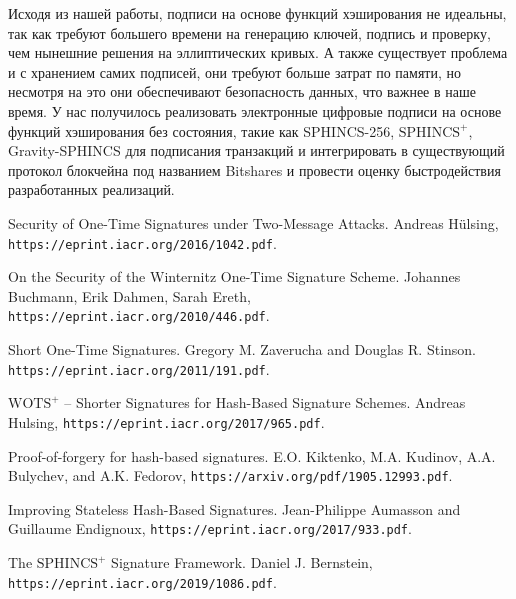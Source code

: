 \documentclass[a4paper, 14pt]{extarticle}
\begin{document}
Исходя из нашей работы, подписи на основе функций хэширования не идеальны, так как требуют большего времени на генерацию ключей, подпись и проверку, чем нынешние решения на эллиптических кривых. А также существует проблема и с хранением самих подписей, они требуют больше затрат по памяти, но несмотря на это они обеспечивают безопасность данных, что важнее в наше время. У нас получилось реализовать электронные цифровые подписи на основе функций хэширования без состояния, такие как SPHINCS-256, $\text{SPHINCS}^+$, Gravity-SPHINCS для подписания транзакций и интегрировать в существующий протокол блокчейна под названием Bitshares и провести оценку быстродействия разработанных реализаций.
\newpage

\begin{thebibliography}{9}
    Security of One-Time Signatures under Two-Message Attacks. Andreas Hülsing,
    \texttt{https://eprint.iacr.org/2016/1042.pdf}.
    
    On the Security of the Winternitz One-Time Signature Scheme. Johannes Buchmann, Erik Dahmen, Sarah Ereth,
    \texttt{https://eprint.iacr.org/2010/446.pdf}.

    Short One-Time Signatures. Gregory M. Zaverucha and Douglas R. Stinson.
    \texttt{https://eprint.iacr.org/2011/191.pdf}.

    $\text{WOTS}^{+}$ – Shorter Signatures for Hash-Based Signature Schemes. Andreas Hulsing,
    \texttt{https://eprint.iacr.org/2017/965.pdf}.

    Proof-of-forgery for hash-based signatures. E.O. Kiktenko, M.A. Kudinov, A.A. Bulychev, and A.K. Fedorov,
    \texttt{https://arxiv.org/pdf/1905.12993.pdf}.

    Improving Stateless Hash-Based Signatures. Jean-Philippe Aumasson and Guillaume Endignoux,
    \texttt{https://eprint.iacr.org/2017/933.pdf}.

    The $\text{SPHINCS}^{+}$ Signature Framework. Daniel J. Bernstein,
    \texttt{https://eprint.iacr.org/2019/1086.pdf}.
\end{thebibliography}
\newpage

\end{document}
